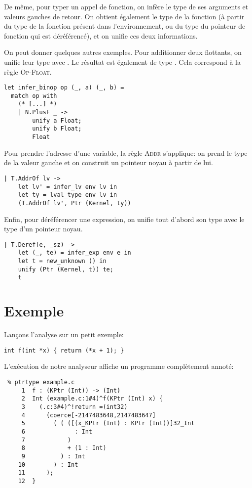 De même, pour typer un appel de fonction, on infère le type de ses arguments et
valeurs gauches de retour. On obtient également le type de la fonction (à partir
du type de la fonction présent dans l'environnement, ou du type du pointeur de
fonction qui est déréférencé), et on unifie ces deux informations.

On peut donner quelques autres exemples. Pour additionner deux flottants, on
unifie leur type avec \tFloat. Le résultat est également de type \tFloat. Cela
correspond à la règle \textsc{Op-Float}.

\begin{verbatim}
let infer_binop op (_, a) (_, b) =
  match op with
    (* [...] *)
    | N.PlusF _ ->
        unify a Float;
        unify b Float;
        Float
\end{verbatim}

Pour prendre l'adresse d'une variable, la règle \textsc{Addr} s'applique: on
prend le type de la valeur gauche et on construit un pointeur noyau à partir de
lui.

\begin{verbatim}
| T.AddrOf lv ->
    let lv' = infer_lv env lv in
    let ty = lval_type env lv in
    (T.AddrOf lv', Ptr (Kernel, ty))
\end{verbatim}

Enfin, pour déréférencer une expression, on unifie tout d'abord son type avec le
type d'un pointeur noyau.

\begin{verbatim}
| T.Deref(e, _sz) ->
    let (_, te) = infer_exp env e in
    let t = new_unknown () in
    unify (Ptr (Kernel, t)) te;
    t
\end{verbatim}

\section{Exemple}

Lançons l'analyse sur un petit exemple:

\begin{verbatim}
int f(int *x) { return (*x + 1); }
\end{verbatim}

L'exécution de notre analyseur affiche un programme complètement annoté:

\begin{verbatim}
 % ptrtype example.c
     1	f : (KPtr (Int)) -> (Int)
     2	Int (example.c:1#4)^f(KPtr (Int) x) {
     3	  (.c:3#4)^!return =(int32)
     4	    (coerce[-2147483648,2147483647]
     5	      ( ( ([(x_KPtr (Int) : KPtr (Int))]32_Int
     6	            : Int
     7	          )
     8	          + (1 : Int)
     9	        ) : Int
    10	      ) : Int
    11	    );
    12	}
\end{verbatim}

